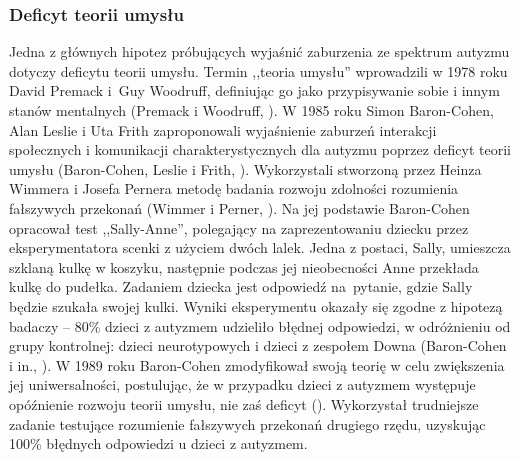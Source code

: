     \subsubsection{Deficyt teorii umysłu}
    \label{subsubsection:teoriaumyslu}
    Jedna z głównych hipotez próbujących wyjaśnić zaburzenia ze spektrum autyzmu dotyczy deficytu teorii umysłu. Termin ,,teoria umysłu'' wprowadzili w 1978 roku David Premack i~Guy Woodruff, definiując go jako przypisywanie sobie i innym stanów mentalnych (Premack i Woodruff, \cite*{premack1978does}).
    W 1985 roku Simon Baron-Cohen, Alan Leslie i Uta Frith zaproponowali wyjaśnienie zaburzeń interakcji społecznych i komunikacji charakterystycznych dla autyzmu poprzez deficyt teorii umysłu (Baron-Cohen, Leslie i Frith, \cite*{baron1985does}).
    Wykorzystali stworzoną przez Heinza Wimmera i Josefa Pernera metodę badania rozwoju zdolności rozumienia fałszywych przekonań (Wimmer i Perner, \cite*{wimmer1983beliefs}).
    Na jej podstawie Baron-Cohen opracował test ,,Sally-Anne'', polegający na zaprezentowaniu dziecku przez eksperymentatora scenki z użyciem dwóch lalek.
    Jedna z postaci, Sally, umieszcza szklaną kulkę w koszyku, następnie podczas jej nieobecności Anne przekłada kulkę do pudełka.
    Zadaniem dziecka jest odpowiedź na~pytanie, gdzie Sally będzie szukała swojej kulki.
    Wyniki eksperymentu okazały się zgodne z hipotezą badaczy -- 80\% dzieci z autyzmem udzieliło błędnej odpowiedzi, w odróżnieniu od grupy kontrolnej: dzieci neurotypowych i dzieci z zespołem Downa (Baron-Cohen i in., \cite*{baron1985does}).
    W 1989 roku Baron-Cohen zmodyfikował swoją teorię w celu zwiększenia jej uniwersalności, postulując, że w przypadku dzieci z autyzmem występuje opóźnienie rozwoju teorii umysłu, nie zaś deficyt (\cite{baron1989autistic}).
    Wykorzystał trudniejsze zadanie testujące rozumienie fałszywych przekonań drugiego rzędu, uzyskując 100\% błędnych odpowiedzi u dzieci z autyzmem.
    
